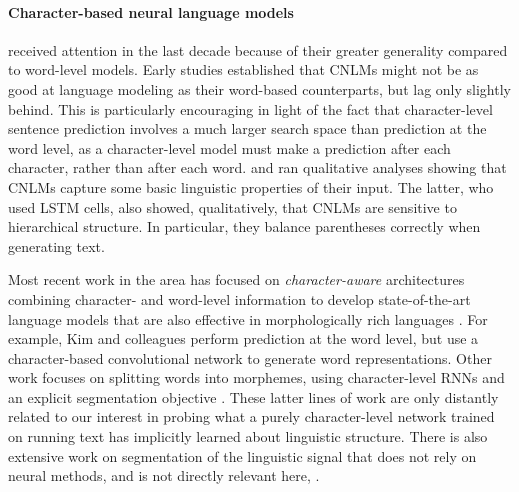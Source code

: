\paragraph{Character-based neural language models} received attention in the last
decade because of their greater generality  compared to word-level models. %
Early studies
\cite{Mikolov:etal:2011,Sutskever:etal:2011,DBLP:journals/corr/Graves13}
established that CNLMs might not be as good at language modeling as
their word-based counterparts, but lag only slightly behind. This is
particularly encouraging in light of the fact that character-level
sentence prediction involves a much larger search space than
prediction at the word level, as a character-level model must make a
prediction after each character, rather than after each
word.  and
 ran qualitative analyses showing
that CNLMs capture some basic linguistic properties of their
input. The latter, who used LSTM cells, also showed, qualitatively,
that CNLMs are sensitive to hierarchical structure. In particular,
they balance parentheses correctly when generating text. %

Most recent work in the area has focused on \emph{character-aware}
architectures combining character- and word-level information to
develop state-of-the-art language models that are also effective in
morphologically rich languages
\citep[e.g.,][]{Bojanowski:etal:2016,Kim:etal:2016,Gerz:etal:2018}. For
example, Kim and colleagues perform prediction at the word level, but
use a character-based convolutional network to generate word
representations. Other work focuses on splitting words into morphemes,
using character-level RNNs and an explicit segmentation objective
\cite[e.g.,][]{Kann:etal:2016}. These latter lines of work are only
distantly related to our interest in probing what a purely
character-level network trained on running text has implicitly learned
about linguistic structure. There is also extensive work on
segmentation of the linguistic signal that does not rely on neural
methods, and is not directly relevant here, \cite[e.g.,][and references there]{Brent:Cartwright:1996,goldwater-bayesian-2009,Kamper:etal:2016}.


